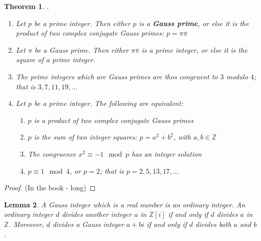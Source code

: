 \documentclass[12pt]{article}
\newtheorem{thm}{Theorem}[section]
\newtheorem{lem}[thm]{Lemma}  %
\theoremstyle{definition}
\theoremstyle{remark}
\numberwithin{equation}{section}
\newcommand\Z{\mathbb Z}    %
\newcommand\B[1]{\textbf{ #1}}
\begin{document}
\begin{thm}
        .\newline\begin{enumerate}
                \item Let $p$ be a prime integer. Then either $p$ is a \B{Gauss prime}, or else it is the product of two complex conjugate Gauss primes: $p = \pi\overline{\pi}$
                \item Let $\pi$ be a Gauss prime. Then either $\pi\overline{\pi}$ is a prime integer, or else it is the square of a prime integer.
                \item The prime integers which are Gauss primes are thos congruent to $3$ modulo $4$; that is $3, 7, 11, 19, ...$
                \item Let $p$ be a prime integer. The following are equivalent:\begin{enumerate}
                                \item $p$ is a product of two complex conjugate Gauss primes
                                \item $p$ is the sum of two integer squares: $p = a^2+b^2$, with $a,b \in\Z$
                                \item The congruence $x^2 \equiv -1 \mod p$ has an integer solution
                                \item $p \equiv 1 \mod 4$, or $p = 2$; that is $p = 2,5,13,17,...$
                \end{enumerate}
        \end{enumerate}
\end{thm}
\begin{proof}
        (In the book - long)
\end{proof}


\vspace{15pt}

\begin{lem}
        A Gauss integer which is a real number is an ordinary integer. An ordinary integer $d$ divides another integer $a$ in $\Z[i]$ if and only if $d$ divides $a$ in $\Z$. Moreover, $d$ divides a Gauss integer $a+bi$ if and only if $d$ divides both $a$ and $b$.
\end{lem}

\vspace{15pt}
\end{document}
